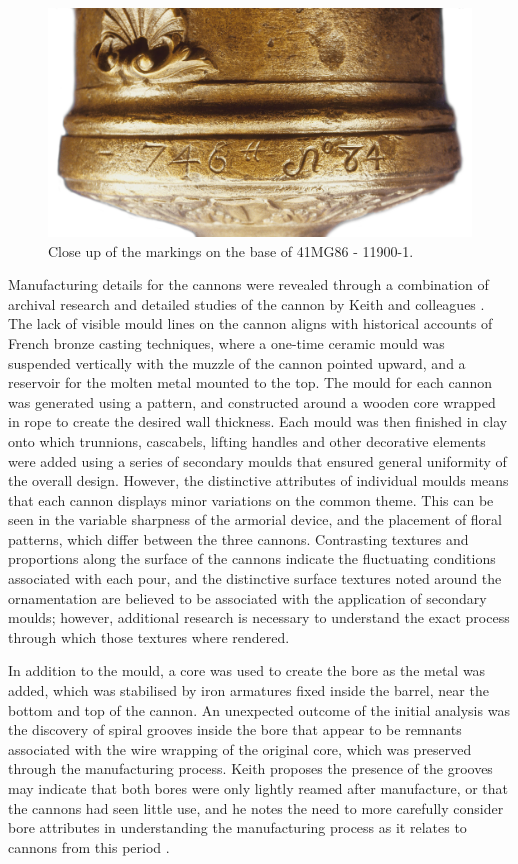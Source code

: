 \documentclass[review]{elsarticle}
\begin{document}
\begin{figure}[ht]\centering
\includegraphics[width=\linewidth]{fig03.jpg}
\caption{Close up of the markings on the base of 41MG86 - 11900-1.}
\label{fig:fig03}
\end{figure}

Manufacturing details for the cannons were revealed through a combination of archival research and detailed studies of the cannon by Keith and colleagues \citep[359-367]{RN5763}. The lack of visible mould lines on the cannon aligns with historical accounts of French bronze casting techniques, where a one-time ceramic mould was suspended vertically with the muzzle of the cannon pointed upward, and a reservoir for the molten metal mounted to the top. The mould for each cannon was generated using a pattern, and constructed around a wooden core wrapped in rope to create the desired wall thickness. Each mould was then finished in clay onto which trunnions, cascabels, lifting handles and other decorative elements were added using a series of secondary moulds that ensured general uniformity of the overall design. However, the distinctive attributes of individual moulds means that each cannon displays minor variations on the common theme. This can be seen in the variable sharpness of the armorial device, and the placement of floral patterns, which differ between the three cannons. Contrasting textures and proportions along the surface of the cannons indicate the fluctuating conditions associated with each pour, and the distinctive surface textures noted around the ornamentation are believed to be associated with the application of secondary moulds; however, additional research is necessary to understand the exact process through which those textures where rendered.

In addition to the mould, a core was used to create the bore as the metal was added, which was stabilised by iron armatures fixed inside the barrel, near the bottom and top of the cannon. An unexpected outcome of the initial analysis was the discovery of spiral grooves inside the bore that appear to be remnants associated with the wire wrapping of the original core, which was preserved through the manufacturing process. Keith proposes the presence of the grooves may indicate that both bores were only lightly reamed after manufacture, or that the cannons had seen little use, and he notes the need to more carefully consider bore attributes in understanding the manufacturing process as it relates to cannons from this period \citep[366]{RN5763}.
\end{document}
